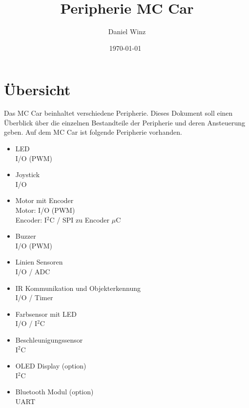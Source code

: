\documentclass[a4paper,10pt,fleqn]{article}
\title{Peripherie MC Car}
\author{Daniel Winz}
\date{\today~\dtc}
\begin{document}
\maketitle

\newpage

\tableofcontents

\newpage

\section{Übersicht}
Das MC Car beinhaltet verschiedene Peripherie. Dieses Dokument soll einen 
Überblick über die einzelnen Bestandteile der Peripherie und deren Ansteuerung 
geben. Auf dem MC Car ist folgende Peripherie vorhanden. 
\begin{itemize}
  \item LED \\
        I/O (PWM)
  \item Joystick \\
        I/O
  \item Motor mit Encoder \\
        Motor: I/O (PWM) \\
        Encoder: I$^2$C / SPI zu Encoder $\mu$C
  \item Buzzer \\
        I/O (PWM)
  \item Linien Sensoren \\
        I/O / ADC
  \item IR Kommunikation und Objekterkennung \\
        I/O / Timer
  \item Farbsensor mit LED \\
        I/O / I$^2$C
  \item Beschleunigungssensor \\
        I$^2$C
  \item OLED Display (option) \\
        I$^2$C
  \item Bluetooth Modul (option) \\
        UART
\end{itemize}
\end{document}

